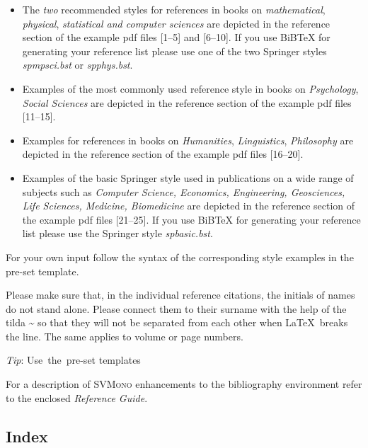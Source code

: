 \documentclass[graybox]{svmono}
\begin{document}
\begin{itemize}
\item The \emph{two} recommended styles for references in books on \emph{mathematical}, \emph{physical}, \emph{statistical and computer sciences} are depicted in the reference section of the example pdf files [1--5] and [6--10]. If you use BiBTeX for generating your reference list please use one of the two Springer styles \emph{spmpsci.bst} or \emph{spphys.bst}.
\item Examples of the most commonly used reference style in books on \emph{Psychology}, \emph{Social Sciences} are depicted in the reference section of the example pdf files [11--15].
\item Examples for references in books on \emph{Humanities}, \emph{Linguistics}, \emph{Philosophy} are depicted in the reference section of the example pdf files [16--20].
\item Examples of the basic Springer style used in publications on a wide range of subjects such as \emph{Computer Science, Economics, Engineering, Geosciences, Life Sciences, Medicine, Biomedicine} are depicted in the reference section of the example pdf files [21--25]. If you use BiBTeX for generating your reference list please use the Springer style \emph{spbasic.bst}.
\end{itemize}

\eject

For your own input follow the syntax of the corresponding style examples in the pre-set template.

Please make sure that, in the individual reference citations, the initials of names do not stand alone. Please connect them to their surname with the help of the tilda \~{} so that they will not be separated from each other when \LaTeX~breaks the line. The same applies to volume or page numbers.

\vspace*{-4.5pc}
\hspace*{29.5pc}\emph{Tip}:
\hspace*{29.5pc}\mbox{Use the pre-set}
\hspace*{29.5pc}\mbox{templates}

\vspace*{3pc}
For a description of \textsc{SVMono} enhancements to the bibliography environment refer to the enclosed \emph{Reference Guide}.

\subsection{Index}
\end{document}
